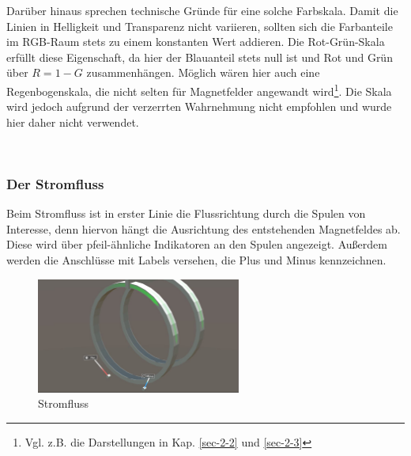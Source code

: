 Darüber hinaus sprechen technische Gründe für eine solche Farbskala. Damit die Linien in Helligkeit und Transparenz nicht variieren, sollten sich die Farbanteile im RGB-Raum stets zu einem konstanten Wert addieren. Die Rot-Grün-Skala erfüllt diese Eigenschaft, da hier der Blauanteil stets null ist und Rot und Grün über $R = 1 - G$ zusammenhängen. Möglich wären hier auch eine Regenbogenskala, die nicht selten für Magnetfelder angewandt wird\footnote{Vgl. z.B. die Darstellungen in Kap. \ref{sec-2-2} und \ref{sec-2-3}}. Die Skala wird jedoch aufgrund der verzerrten Wahrnehmung nicht empfohlen und wurde hier daher nicht verwendet.

\vspace{4px}
\begin{center}
	\\
\end{center}
\vspace{6px}

\subsubsection{Der Stromfluss} 
\label{sec-4-2-3}
Beim Stromfluss ist in erster Linie die Flussrichtung durch die Spulen von Interesse, denn hiervon hängt die Ausrichtung des entstehenden Magnetfeldes ab. Diese wird über pfeil-ähnliche Indikatoren an den Spulen angezeigt. Außerdem werden die Anschlüsse mit Labels versehen, die Plus und Minus kennzeichnen.

\begin{figure}[H]
	\centering
	\includegraphics[width=0.6\textwidth]{images/current.jpg}
	\caption{Stromfluss}
	\label{img:current}
\end{figure}


